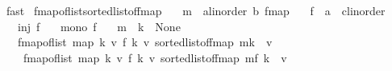 \begin{isabellebody}
\ fast\isanewline
{}\isamarkupfalse%
%
\endisatagproof
{\isafoldproof}%
%
\isadelimproof
\isanewline
%
\endisadelimproof
\isanewline
{}\isamarkupfalse%
\ fmap{\isacharunderscore}{\kern0pt}of{\isacharunderscore}{\kern0pt}list{\isacharunderscore}{\kern0pt}sorted{\isacharunderscore}{\kern0pt}list{\isacharunderscore}{\kern0pt}of{\isacharunderscore}{\kern0pt}fmap{\isacharcolon}{\kern0pt}\isanewline
\ \ \ m\ {\isacharcolon}{\kern0pt}{\isacharcolon}{\kern0pt}\ {\isachardoublequoteopen}{\isacharparenleft}{\kern0pt}{\isacharprime}{\kern0pt}a{\isacharcolon}{\kern0pt}{\isacharcolon}{\kern0pt}linorder{\isacharcomma}{\kern0pt}\ {\isacharprime}{\kern0pt}b{\isacharparenright}{\kern0pt}\ fmap{\isachardoublequoteclose}\isanewline
\ \ \ f\ {\isacharcolon}{\kern0pt}{\isacharcolon}{\kern0pt}\ {\isachardoublequoteopen}{\isacharprime}{\kern0pt}a\ {\isasymRightarrow}\ {\isacharprime}{\kern0pt}c{\isacharcolon}{\kern0pt}{\isacharcolon}{\kern0pt}linorder{\isachardoublequoteclose}\isanewline
\ \ \ {\isachardoublequoteopen}inj\ f{\isachardoublequoteclose}\isanewline
\ \ \ {\isachardoublequoteopen}mono\ f{\isachardoublequoteclose}\isanewline
\ \ \ {\isachardoublequoteopen}m\ {\isachardollar}{\kern0pt}{\isachardollar}{\kern0pt}\ k\ {\isacharequal}{\kern0pt}\ None{\isachardoublequoteclose}\isanewline
\ \ \ {\isachardoublequoteopen}fmap{\isacharunderscore}{\kern0pt}of{\isacharunderscore}{\kern0pt}list\ {\isacharparenleft}{\kern0pt}map\ {\isacharparenleft}{\kern0pt}{\isasymlambda}{\isacharparenleft}{\kern0pt}k{\isacharcomma}{\kern0pt}\ v{\isacharparenright}{\kern0pt}{\isachardot}{\kern0pt}\ {\isacharparenleft}{\kern0pt}f\ k{\isacharcomma}{\kern0pt}\ v{\isacharparenright}{\kern0pt}{\isacharparenright}{\kern0pt}\ {\isacharparenleft}{\kern0pt}sorted{\isacharunderscore}{\kern0pt}list{\isacharunderscore}{\kern0pt}of{\isacharunderscore}{\kern0pt}fmap\ {\isacharparenleft}{\kern0pt}m{\isacharparenleft}{\kern0pt}k\ {\isachardollar}{\kern0pt}{\isachardollar}{\kern0pt}{\isacharcolon}{\kern0pt}{\isacharequal}{\kern0pt}\ v{\isacharparenright}{\kern0pt}{\isacharparenright}{\kern0pt}{\isacharparenright}{\kern0pt}{\isacharparenright}{\kern0pt}\ {\isacharequal}{\kern0pt}\isanewline
\ \ \ \ {\isacharparenleft}{\kern0pt}fmap{\isacharunderscore}{\kern0pt}of{\isacharunderscore}{\kern0pt}list\ {\isacharparenleft}{\kern0pt}map\ {\isacharparenleft}{\kern0pt}{\isasymlambda}{\isacharparenleft}{\kern0pt}k{\isacharcomma}{\kern0pt}\ v{\isacharparenright}{\kern0pt}{\isachardot}{\kern0pt}\ {\isacharparenleft}{\kern0pt}f\ k{\isacharcomma}{\kern0pt}\ v{\isacharparenright}{\kern0pt}{\isacharparenright}{\kern0pt}\ {\isacharparenleft}{\kern0pt}sorted{\isacharunderscore}{\kern0pt}list{\isacharunderscore}{\kern0pt}of{\isacharunderscore}{\kern0pt}fmap\ m{\isacharparenright}{\kern0pt}{\isacharparenright}{\kern0pt}{\isacharparenright}{\kern0pt}{\isacharparenleft}{\kern0pt}f\ k\ {\isachardollar}{\kern0pt}{\isachardollar}{\kern0pt}{\isacharcolon}{\kern0pt}{\isacharequal}{\kern0pt}\ v{\isacharparenright}{\kern0pt}{\isachardoublequoteclose}\isanewline

\end{isabellebody}
